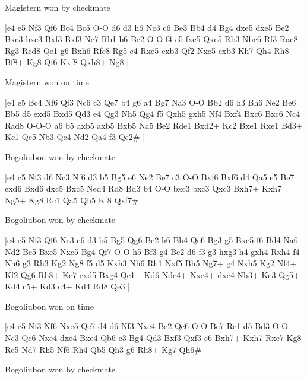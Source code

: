 \showboard

Magistern won by checkmate

\makegametitle
|e4 e5 Nf3 Qf6 Bc4 Bc5 O-O d6 d3 h6 Nc3 c6 Be3 Bb4 d4 Bg4 dxe5 dxe5 Be2 Bxc3 bxc3 Bxf3 Bxf3 Ne7 Rb1 b6 Be2 O-O f4 c5 fxe5 Qxe5 Rb3 Nbc6 Rf3 Rac8 Rg3 Rcd8 Qe1 g6 Bxh6 Rfe8 Rg5 c4 Rxe5 cxb3 Qf2 Nxe5 cxb3 Kh7 Qh4 Rh8 Bf8+ Kg8 Qf6 Kxf8 Qxh8+ Ng8  |

\showboard

Magistern won on time

\makegametitle
|e4 e5 Bc4 Nf6 Qf3 Nc6 c3 Qe7 b4 g6 a4 Bg7 Na3 O-O Bb2 d6 h3 Bh6 Ne2 Be6 Bb5 d5 exd5 Bxd5 Qd3 e4 Qg3 Nh5 Qg4 f5 Qxh5 gxh5 Nf4 Bxf4 Bxc6 Bxc6 Nc4 Rad8 O-O-O a6 b5 axb5 axb5 Bxb5 Na5 Be2 Rde1 Bxd2+ Kc2 Bxe1 Rxe1 Bd3+ Kc1 Qc5 Nb3 Qc4 Nd2 Qa4 f3 Qc2\#  |

\showboard

Bogoliubon won by checkmate

\makegametitle
|e4 c5 Nf3 d6 Nc3 Nf6 d3 b5 Bg5 e6 Ne2 Be7 c3 O-O Bxf6 Bxf6 d4 Qa5 e5 Be7 exd6 Bxd6 dxc5 Bxc5 Ned4 Rd8 Bd3 b4 O-O bxc3 bxc3 Qxc3 Bxh7+ Kxh7 Ng5+ Kg8 Rc1 Qa5 Qh5 Kf8 Qxf7\#  |

\showboard

Bogoliubon won by checkmate

\makegametitle
|e4 e5 Nf3 Qf6 Nc3 c6 d3 b5 Bg5 Qg6 Be2 h6 Bh4 Qe6 Bg3 g5 Bxe5 f6 Bd4 Na6 Nd2 Bc5 Bxc5 Nxc5 Bg4 Qf7 O-O h5 Bf3 g4 Be2 d6 f3 g3 hxg3 h4 gxh4 Rxh4 f4 Nh6 g3 Rh3 Kg2 Ng8 f5 d5 Kxh3 Nh6 Rh1 Nxf5 Bh5 Ng7+ g4 Nxh5 Kg2 Nf4+ Kf2 Qg6 Rh8+ Ke7 exd5 Bxg4 Qe1+ Kd6 Nde4+ Nxe4+ dxe4 Nh3+ Ke3 Qg5+ Kd4 c5+ Kd3 c4+ Kd4 Rd8 Qe3  |

\showboard

Bogoliubon won on time

\makegametitle
|e4 e5 Nf3 Nf6 Nxe5 Qe7 d4 d6 Nf3 Nxe4 Be2 Qe6 O-O Be7 Re1 d5 Bd3 O-O Nc3 Qc6 Nxe4 dxe4 Bxe4 Qb6 c3 Bg4 Qd3 Bxf3 Qxf3 c6 Bxh7+ Kxh7 Rxe7 Kg8 Re5 Nd7 Rh5 Nf6 Rh4 Qb5 Qh3 g6 Rh8+ Kg7 Qh6\#  |

\showboard

Bogoliubon won by checkmate

